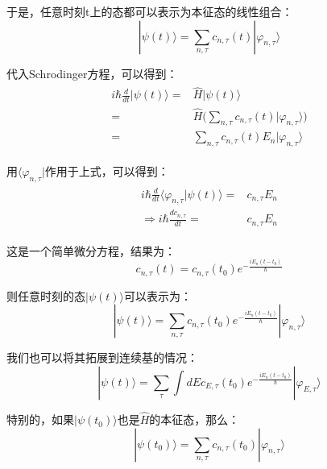         于是，任意时刻t上的态都可以表示为本征态的线性组合：
        \begin{equation}
            |\psi(t)\rangle=\sum_{n,\tau}c_{n,\tau}(t)|\varphi_{n,\tau}\rangle
        \end{equation}
        
        代入Schrodinger方程，可以得到：
        \begin{align}
            \begin{split}
                i\hbar\frac{d}{dt}|\psi(t)\rangle=&\hat{H}|\psi(t)\rangle\\
                =&\hat{H}\Big(\sum_{n,\tau}c_{n,\tau}(t)|\varphi_{n,\tau}\rangle\Big)\\
                =&\sum_{n,\tau}c_{n,\tau}(t)E_n|\varphi_{n,\tau}\rangle
            \end{split}
        \end{align}
        
        用$\langle\varphi_{n,\tau}|$作用于上式，可以得到：
        \begin{align}
            \begin{split}
                i\hbar\frac{d}{dt}\langle \varphi_{n,\tau}|\psi(t)\rangle=&c_{n,\tau}E_n\\
                \Rightarrow i\hbar\frac{dc_{n,\tau}}{dt}=&c_{n,\tau}E_n
            \end{split}
        \end{align}
        
        这是一个简单微分方程，结果为：
        \begin{equation}
            c_{n,\tau}(t)=c_{n,\tau}(t_0)e^{-\frac{iE_n(t-t_0)}{\hbar}}
        \end{equation}
        
        则任意时刻的态$|\psi(t)\rangle$可以表示为：
        \begin{equation}
            |\psi(t)\rangle=\sum_{n,\tau}c_{n,\tau}(t_0)e^{-\frac{iE_n(t-t_0)}{\hbar}}|\varphi_{n,\tau}\rangle
        \end{equation}
        
        我们也可以将其拓展到连续基的情况：
        \begin{equation}
            |\psi(t)\rangle=\sum_{\tau}\int dE c_{E,\tau}(t_0)e^{-\frac{iE_n(t-t_0)}{\hbar}}|\varphi_{E,\tau}\rangle
        \end{equation}
        
        特别的，如果$|\psi(t_0)\rangle$也是$\hat{H}$的本征态，那么：
        \begin{equation}
            |\psi(t_0)\rangle =\sum_{n,\tau}c_{n,\tau}(t_0)|\varphi_{n,\tau}\rangle
        \end{equation}
        
